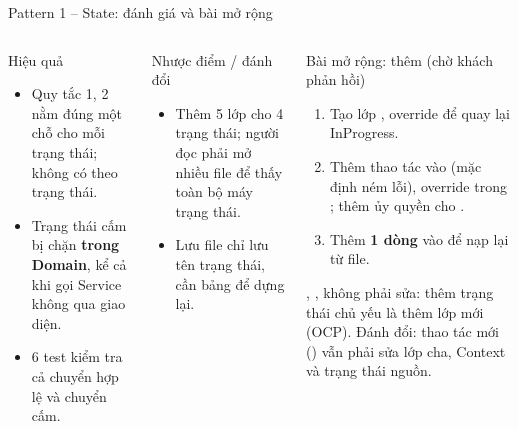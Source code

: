 \begin{frame}{Pattern 1 -- State: đánh giá và bài mở rộng}
\begin{columns}[T]
\begin{block}{Hiệu quả}
\scriptsize
\begin{itemize}
  \item Quy tắc 1, 2 nằm đúng một chỗ cho mỗi trạng thái;  không có  theo trạng thái.
  \item Trạng thái cấm bị chặn \textbf{trong Domain}, kể cả khi gọi Service không qua giao diện.
  \item 6 test  kiểm tra cả chuyển hợp lệ và chuyển cấm.
\end{itemize}
\end{block}
\begin{block}{Nhược điểm / đánh đổi}
\scriptsize
\begin{itemize}
  \item Thêm 5 lớp cho 4 trạng thái; người đọc phải mở nhiều file để thấy toàn bộ máy trạng thái.
  \item Lưu file chỉ lưu tên trạng thái, cần bảng  để dựng lại.
\end{itemize}
\end{block}
\begin{block}{Bài mở rộng: thêm  (chờ khách phản hồi)}
\scriptsize
\begin{enumerate}
  \item Tạo lớp , override  để quay lại InProgress.
  \item Thêm thao tác  vào  (mặc định ném lỗi), override trong ; thêm  ủy quyền cho .
  \item Thêm \textbf{1 dòng} vào  để nạp lại từ file.
\end{enumerate}
, ,  không phải sửa: thêm trạng thái chủ yếu là thêm lớp mới (OCP). Đánh đổi: thao tác mới () vẫn phải sửa lớp cha, Context và trạng thái nguồn.
\end{block}
\end{columns}
\end{frame}

